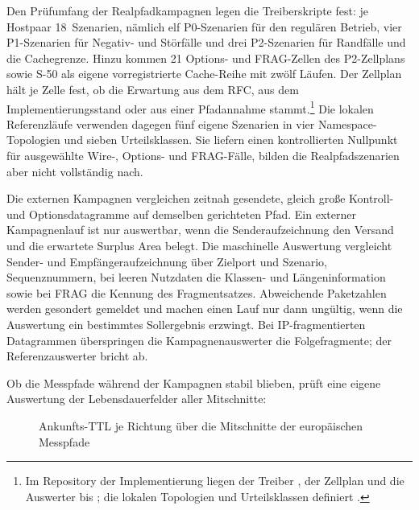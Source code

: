 Den Prüfumfang der Realpfadkampagnen legen die Treiberskripte fest: je Hostpaar 18~Szenarien,
nämlich elf P0-Szenarien für den regulären Betrieb, vier P1-Szenarien für Negativ- und Störfälle und drei
P2-Szenarien für Randfälle und die Cachegrenze. Hinzu kommen 21 Options- und FRAG-Zellen des P2-Zellplans
sowie S-50 als eigene vorregistrierte Cache-Reihe mit zwölf
Läufen. Der Zellplan hält je Zelle fest, ob die Erwartung aus dem RFC, aus dem Implementierungs\-stand
oder aus einer Pfadannahme stammt.\footnote{Im Repository der Implementierung liegen der Treiber
, der Zellplan  und die Auswerter
 bis ; die lokalen Topologien und Urteilsklassen
definiert .} Die lokalen Referenzläufe verwenden dagegen fünf eigene Szenarien in vier
Namespace-Topologien und sieben Urteilsklassen. Sie liefern einen kontrollierten Nullpunkt für
ausgewählte Wire-, Options- und FRAG-Fälle, bilden die Realpfadszenarien aber nicht vollständig nach.

Die externen Kampagnen vergleichen zeitnah gesendete, gleich große Kontroll- und Optionsdatagramme auf
demselben gerichteten Pfad. Ein externer Kampagnen\-lauf ist nur auswertbar, wenn die Senderaufzeichnung
den Versand und die erwartete Surplus Area belegt. Die maschinelle Auswertung vergleicht Sender- und
Empfänger\-aufzeichnung über Zielport und Szenario,
Sequenznummern, bei leeren Nutzdaten die Klassen- und Längeninformation sowie bei FRAG die Kennung des
Fragmentsatzes. Abweichende Paketzahlen werden gesondert gemeldet und machen einen Lauf nur dann ungültig,
wenn die Auswertung ein bestimmtes Sollergebnis erzwingt. Bei IP-fragmentierten Datagrammen überspringen
die Kampagnenauswerter die Folgefragmente; der Referenz\-auswerter bricht ab.

Ob die Messpfade während der Kampagnen stabil blieben, prüft eine eigene Auswertung der
Lebensdauerfelder aller Mitschnitte:

\begin{figure}[H]
    \centering
    
    \caption[Ankunfts-TTL je Richtung]{Ankunfts-TTL je Richtung über die Mitschnitte der europäischen
      Messpfade}
    \label{fig:eval-ttl}
\end{figure}

